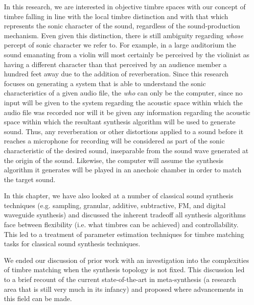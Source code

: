 \documentclass[a4paper,12pt]{report} 	%
\numberwithin{figure}{chapter}
\numberwithin{table}{chapter}
\numberwithin{equation}{chapter}
\begin{document}
\begin{flushleft}
In this research, we are interested in objective timbre spaces with our concept of timbre falling in line with the local timbre distinction and with that which represents the sonic character of the sound, regardless of the sound-production mechanism. Even given this distinction, there is still ambiguity regarding \emph{whose} percept of sonic character we refer to. For example, in a large auditorium the sound emanating from a violin will most certainly be perceived by the violinist as having a different character than that perceived by an audience member a hundred feet away due to the addition of reverberation. Since this research focuses on generating a system  that is able to understand the sonic characteristics of a given audio file, the \emph{who} can only be the computer, since no input will be given to the system regarding the acoustic space within which the audio file was recorded nor will it be given any information regarding the acoustic space within which the resultant synthesis algorithm will be used to generate sound. Thus, any reverberation or other distortions applied to a sound before it reaches a microphone for recording will be considered as part of the sonic characteristic of the desired sound, inseparable from the sound wave generated at the origin of the sound. Likewise, the computer will assume the synthesis algorithm it generates will be played in an anechoic chamber in order to match the target sound.

In this chapter, we have also looked at a number of classical sound synthesis techniques (e.g. sampling, granular, additive, subtractive, FM, and digital waveguide synthesis) and discussed the inherent tradeoff all synthesis algorithms face between flexibility (i.e. what timbres can be achieved) and controllability. This led to a treatment of parameter estimation techniques for timbre matching tasks for classical sound synthesis techniques.

We ended our discussion of prior work with an investigation into the complexities of timbre matching when the synthesis topology is not fixed. This discussion led to a brief recount of the current state-of-the-art in meta-synthesis (a research area that is still very much in its infancy) and proposed where advancements in this field can be made.

\vspace*{\QuarterPage}

\end{flushleft}
\end{document}
